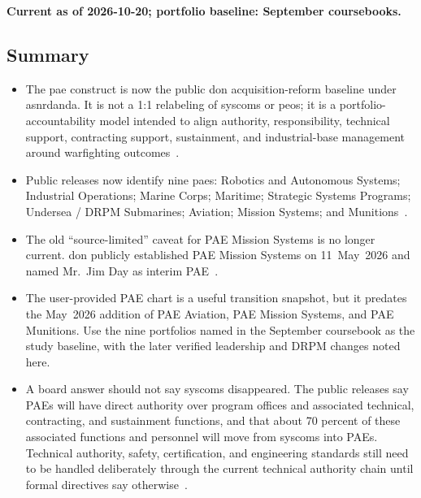 \documentclass[../main.tex]{subfiles}
\begin{document}
\label{app:pae-construct-mapping}
\textbf{Current as of 2026-10-20; portfolio baseline: September coursebooks.}

\subsection{Summary}
\begin{itemize}
  \item The \ac{pae} construct is now the public \ac{don} acquisition-reform baseline under \ac{asnrdanda}. It is not a 1:1 relabeling of \acp{syscom} or \acp{peo}; it is a portfolio-accountability model intended to align authority, responsibility, technical support, contracting support, sustainment, and industrial-base management around warfighting outcomes~\autocite{DON-PAE-Establishment-2026,DON-PAE-Expansion-May2026}.
  \item Public releases now identify nine \acp{pae}: Robotics and Autonomous Systems; Industrial Operations; Marine Corps; Maritime; Strategic Systems Programs; Undersea / DRPM Submarines; Aviation; Mission Systems; and Munitions~\autocite{DON-PAE-Establishment-2026,DON-PAE-Expansion-May2026}.
  \item The old ``source-limited'' caveat for PAE Mission Systems is no longer current. \ac{don} publicly established PAE Mission Systems on 11~May~2026 and named Mr.\ Jim Day as interim PAE~\autocite{DON-PAE-Expansion-May2026,DON-PAE-Mission-Systems-2026}.
  \item The user-provided PAE chart is a useful transition snapshot, but it predates the May~2026 addition of PAE Aviation, PAE Mission Systems, and PAE Munitions. Use the nine portfolios named in the September coursebook as the study baseline, with the later verified leadership and DRPM changes noted here.
  \item A board answer should not say \acp{syscom} disappeared. The public releases say PAEs will have direct authority over program offices and associated technical, contracting, and sustainment functions, and that about 70 percent of these associated functions and personnel will move from \acp{syscom} into PAEs. Technical authority, safety, certification, and engineering standards still need to be handled deliberately through the current technical authority chain until formal directives say otherwise~\autocite{DON-PAE-Expansion-May2026}.
\end{itemize}
\end{document}
